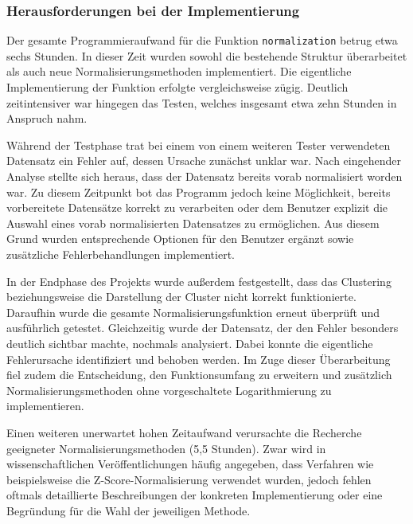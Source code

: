 \documentclass[12pt]{article}
\begin{document}
\subsubsection{Herausforderungen bei der Implementierung}
\label{herausforderung-rosina}

Der gesamte Programmieraufwand für die Funktion \texttt{normalization} betrug etwa sechs Stunden. In dieser Zeit wurden sowohl die bestehende Struktur überarbeitet als auch neue Normalisierungsmethoden implementiert. Die eigentliche Implementierung der Funktion erfolgte vergleichsweise zügig. Deutlich zeitintensiver war hingegen das Testen, welches insgesamt etwa zehn Stunden in Anspruch nahm.

Während der Testphase trat bei einem von einem weiteren Tester verwendeten Datensatz ein Fehler auf, dessen Ursache zunächst unklar war. Nach eingehender Analyse stellte sich heraus, dass der Datensatz bereits vorab normalisiert worden war. Zu diesem Zeitpunkt bot das Programm jedoch keine Möglichkeit, bereits vorbereitete Datensätze korrekt zu verarbeiten oder dem Benutzer explizit die Auswahl eines vorab normalisierten Datensatzes zu ermöglichen. Aus diesem Grund wurden entsprechende Optionen für den Benutzer ergänzt sowie zusätzliche Fehlerbehandlungen implementiert.

In der Endphase des Projekts wurde außerdem festgestellt, dass das Clustering beziehungsweise die Darstellung der Cluster nicht korrekt funktionierte. Daraufhin wurde die gesamte Normalisierungsfunktion erneut überprüft und ausführlich getestet. Gleichzeitig wurde der Datensatz, der den Fehler besonders deutlich sichtbar machte, nochmals analysiert. Dabei konnte die eigentliche Fehlerursache identifiziert und behoben werden. Im Zuge dieser Überarbeitung fiel zudem die Entscheidung, den Funktionsumfang zu erweitern und zusätzlich Normalisierungsmethoden ohne vorgeschaltete Logarithmierung zu implementieren.

Einen weiteren unerwartet hohen Zeitaufwand verursachte die Recherche geeigneter Normalisierungsmethoden (5,5 Stunden). Zwar wird in wissenschaftlichen Veröffentlichungen häufig angegeben, dass Verfahren wie beispielsweise die Z-Score-Normalisierung verwendet wurden, jedoch fehlen oftmals detaillierte Beschreibungen der konkreten Implementierung oder eine Begründung für die Wahl der jeweiligen Methode.

\newpage
\pagestyle{fancy}
\fancyhead{}
\end{document}

